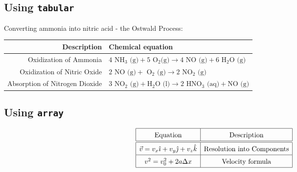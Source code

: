 \documentclass{article}
\begin{document}
\subsection{Using \texttt{tabular}} %
Converting ammonia into nitric acid - the Ostwald Process\cite{Ostwald}:
\begin{center}
\begin{tabular}{r|l}
Description & Chemical equation\\ \hline
Oxidization of Ammonia & $\mbox{4 NH}_3  \mbox{ (g)} + 5  \mbox{ O}_2  \mbox{(g)} \rightarrow 4  \mbox{ NO (g)} + 6  \mbox{ H}_2\mbox{O (g)}$\\
Oxidization of Nitric Oxide & $2 \mbox{ NO} \mbox{ (g)} + \mbox{ O}_2 \mbox{ (g)} \rightarrow 2 \mbox{ NO}_2 \mbox{ (g)}$\\
Absorption of Nitrogen Dioxide & $3 \mbox{ NO}_2 \mbox{ (g)} + \mbox{H}_2 \mbox{O (l)} \rightarrow 2 \mbox{ HNO}_3 \mbox{ (aq)} + \mbox{NO (g)}$
\end{tabular} 
\end{center}
\subsection{Using \texttt{array}} %
\begin{center}
\[
\renewcommand{\arraystretch}{1.5}
\begin{array}{|c|c|}\hline
\mbox{Equation} & \mbox{Description}\\ \hline \hline
\vec{v}=v_x\hat{\imath}+v_y\hat{\jmath}+v_z\hat{k} & \mbox{Resolution into Components}\\ \hline
v^2=v_0^2+2a\Delta x & \mbox{Velocity formula}\\ \hline
\end{array}
\]
\end{center}
\pagebreak
\end{document}
